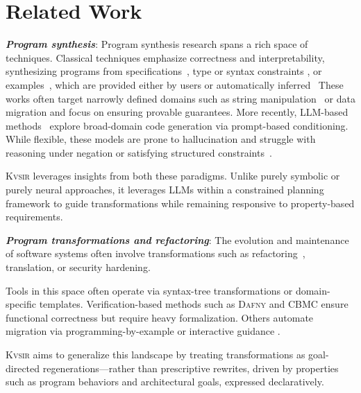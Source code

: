 \documentclass[sigplan,review,anonymous,10pt]{acmart}
\newcommand{\sys}{{\scshape Kv{\textalpha}sir}\xspace}
\newcommand{\heading}[1]{\vspace{2pt}\noindent\textbf{\emph{#1}}:\enspace}
\begin{document}
\section{Related Work}

\heading{Program synthesis}
Program synthesis research spans a rich space of techniques.
Classical techniques emphasize correctness and
interpretability, synthesizing programs from specifications~\cite{alur2013syntax, feser2015synthesizing, gulwani2011automating,leino2016dafny},
type or syntax constraints \cite{polikarpova2016program,reynolds2019syguscomp},
or examples~\cite{jha2010oracle, raza2018disjunctive, singh2016blinkfill,wu2023programming},
which are provided either by users or automatically inferred~\cite{cambronero2019active,harp:ccs:2021}
These works often target narrowly
defined domains such as string manipulation~\cite{harp:ccs:2021} or data migration
\cite{yaghmazadeh2018automated} and focus on ensuring provable guarantees.
More recently, LLM-based methods~\cite{austin2021program, chen2021evaluating}
explore broad-domain code generation via prompt-based conditioning.
While flexible, these models are prone to hallucination and struggle
with reasoning under negation or satisfying structured constraints~\cite{xu2023llmfoolitselfpromptbased, wu2023deceptpromptexploitingllmdrivencode,jiang2024llmsdreamelephantswhen,hwang2024thinkpinkelephant}.

\sys leverages insights from both these paradigms.
Unlike purely symbolic or purely neural approaches, it leverages LLMs within a
constrained planning framework to guide transformations while remaining
responsive to property-based requirements.

\heading{Program transformations and refactoring}
The evolution and maintenance of software systems often involve transformations
such as refactoring~\cite{Fowler99,Mens04,Myers16}, translation, or security hardening. %

Tools in this space often operate via syntax-tree transformations or
domain-specific templates. Verification-based methods such as \textsc{Dafny}
\cite{leino2016dafny} and \textsc{CBMC} \cite{Clarke04} ensure functional correctness
but require heavy formalization.
Others automate migration via
programming-by-example or interactive guidance \cite{gulwani2017program, le2017interactive}.


\sys aims to generalize this landscape by treating transformations as
goal-directed regenerations---rather than prescriptive rewrites, driven by
properties such as program behaviors and architectural goals, expressed declaratively.
\end{document}
